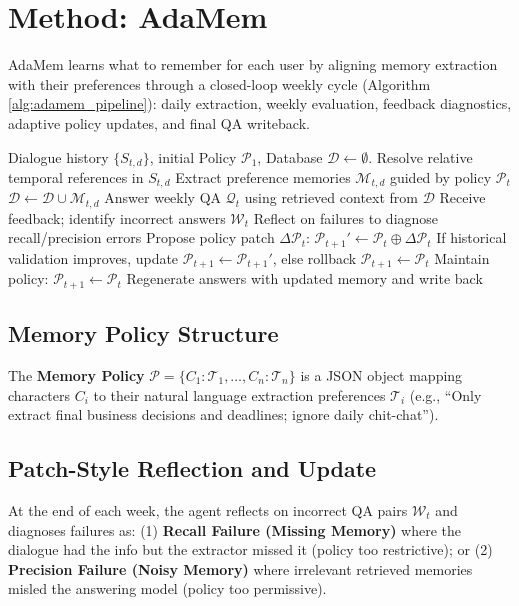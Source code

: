 \documentclass[11pt]{article}
\begin{document}
\section{Method: AdaMem}
AdaMem learns what to remember for each user by aligning memory extraction with their preferences through a closed-loop weekly cycle (Algorithm \ref{alg:adamem_pipeline}): daily extraction, weekly evaluation, feedback diagnostics, adaptive policy updates, and final QA writeback.

\begin{algorithm}[t]
\caption{AdaMem Pipeline}
\label{alg:adamem_pipeline}
\begin{algorithmic}[1]
\REQUIRE Dialogue history $\{S_{t,d}\}$, initial Policy $\mathcal{P}_1$, Database $\mathcal{D} \leftarrow \emptyset$.
        \STATE Resolve relative temporal references in $S_{t,d}$
        \STATE Extract preference memories $\mathcal{M}_{t,d}$ guided by policy $\mathcal{P}_t$
        \STATE $\mathcal{D} \leftarrow \mathcal{D} \cup \mathcal{M}_{t,d}$
    \ENDFOR
    \STATE Answer weekly QA $\mathcal{Q}_t$ using retrieved context from $\mathcal{D}$
    \STATE Receive feedback; identify incorrect answers $\mathcal{W}_t$
        \STATE Reflect on failures to diagnose recall/precision errors
        \STATE Propose policy patch $\Delta \mathcal{P}_t$: $\mathcal{P}_{t+1}' \leftarrow \mathcal{P}_t \oplus \Delta \mathcal{P}_t$
        \STATE If historical validation improves, update $\mathcal{P}_{t+1} \leftarrow \mathcal{P}_{t+1}'$, else rollback $\mathcal{P}_{t+1} \leftarrow \mathcal{P}_t$
    \ELSE
        \STATE Maintain policy: $\mathcal{P}_{t+1} \leftarrow \mathcal{P}_t$
    \ENDIF
    \STATE Regenerate answers with updated memory and write back
\ENDFOR
\end{algorithmic}
\end{algorithm}

\subsection{Memory Policy Structure}
The \textbf{Memory Policy} $\mathcal{P} = \{ C_1: \mathcal{T}_1, \dots, C_n: \mathcal{T}_n \}$ is a JSON object mapping characters $C_i$ to their natural language extraction preferences $\mathcal{T}_i$ (e.g., ``Only extract final business decisions and deadlines; ignore daily chit-chat'').

\subsection{Patch-Style Reflection and Update}
At the end of each week, the agent reflects on incorrect QA pairs $\mathcal{W}_t$ and diagnoses failures as: (1) \textbf{Recall Failure (Missing Memory)} where the dialogue had the info but the extractor missed it (policy too restrictive); or (2) \textbf{Precision Failure (Noisy Memory)} where irrelevant retrieved memories misled the answering model (policy too permissive).
\end{document}
